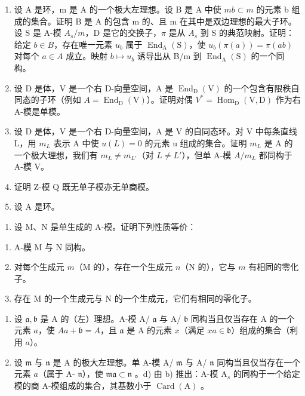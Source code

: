 
\begin{enumerate}
\def\labelenumi{\arabic{enumi})}
\item
  设 A 是环，m 是 A 的一个极大左理想。设 B 是 A 中使 \(mb \subset m\) 的元素 b 组成的集合。证明 B 是 A 的包含 m 的、且 m 在其中是双边理想的最大子环。设 S 是 A-模 \(A_{s}/m\)，D 是它的交换子，\(\pi\) 是从 \(A_{s}\) 到 S 的典范映射。证明：给定 \(b \in B\)，存在唯一元素 \(u_{b}\) 属于 \(\operatorname{End}_{\mathrm{A}}(\mathrm{S})\)，使 \(u_{b}(\pi(a)) = \pi(ab)\) 对每个 \(a \in A\) 成立。映射 \(b \mapsto u_{b}\) 诱导出从 B/m 到 \(\operatorname{End}_{\mathrm{A}}(\mathrm{S})\) 的一个同构。
\item
  设 D 是体，V 是一个右 D-向量空间，A 是 \(\operatorname{End}_{\mathrm{D}}(\mathrm{V})\) 的一个包含有限秩自同态的子环（例如 \(A = \operatorname{End}_{\mathrm{D}}(\mathrm{V})\)）。证明对偶 \(V^{*} = \operatorname{Hom}_{\mathrm{D}}(\mathrm{V}, \mathrm{D})\) 作为右 A-模是单模。
\item
  设 D 是体，V 是一个右 D-向量空间，A 是 V 的自同态环。对 V 中每条直线 L，用 \(m_{L}\) 表示 A 中使 \(u(L)=0\) 的元素 u 组成的集合。证明 \(m_{L}\) 是 A 的一个极大理想，我们有 \(m_{L}\neq m_{L'}\)（对 \(L\neq L'\)），但单 A-模 \(A/m_{L}\) 都同构于 A-模 V。
\item
  证明 Z-模 Q 既无单子模亦无单商模。
\item
  设 \(\mathrm{A}\) 是环。
\end{enumerate}

\begin{enumerate}
\def\labelenumi{\alph{enumi})}
\tightlist
\item
  设 M、N 是单生成的 A-模。证明下列性质等价：
\end{enumerate}

\begin{enumerate}
\def\labelenumi{(\roman{enumi})}
\item
  A-模 M 与 N 同构。
\item
  对每个生成元 \(m\)（\(\mathrm{M}\) 的），存在一个生成元 \(n\)（\(\mathrm{N}\) 的），它与 \(m\) 有相同的零化子。
\item
  存在 M 的一个生成元与 N 的一个生成元，它们有相同的零化子。
\end{enumerate}

\begin{enumerate}
\def\labelenumi{\alph{enumi})}
\setcounter{enumi}{1}
\item
  设 \(\mathfrak{a},\mathfrak{b}\) 是 A 的（左）理想。A-模 A/ \(\mathfrak{a}\) 与 A/ \(\mathfrak{b}\) 同构当且仅当存在 A 的一个元素 \(a\)，使 \(Aa + \mathfrak{b} = A\)，且 \(\mathfrak{a}\) 是 A 的元素 \(x\)（满足 \(xa\in \mathfrak{b}\)）组成的集合（利用 \(a\)）。
\item
  设 \(\mathfrak{m}\) 与 \(\mathfrak{n}\) 是 A 的极大左理想。单 A-模 A/ \(\mathfrak{m}\) 与 A/ \(\mathfrak{n}\) 同构当且仅当存在一个元素 \(a\)（属于 A- \(\mathfrak{n}\)），使 \(\mathfrak{ma} \subset \mathfrak{n}\) 。d) 由 b) 推出：A-模 \(\mathrm{A}_s\) 的同构于一个给定模的商 A-模组成的集合，其基数小于 \(\operatorname{Card}(\mathrm{A})\) 。
\end{enumerate}

